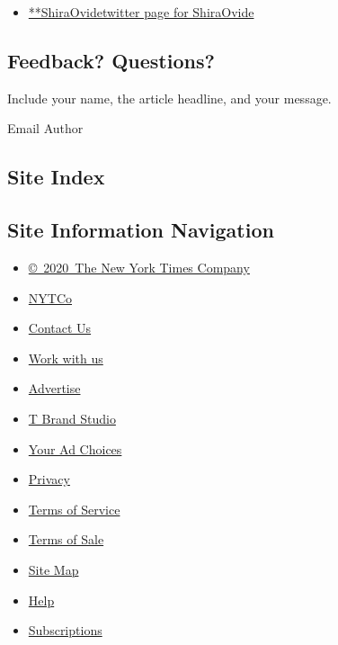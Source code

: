 \begin{itemize}
\tightlist
\item
  \href{https://twitter.com/ShiraOvide}{**ShiraOvidetwitter page for
  ShiraOvide}
\end{itemize}

\hypertarget{feedback-questions}{%
\subsection{Feedback? Questions?}\label{feedback-questions}}

Include your name, the article headline, and your message.

Email Author

\hypertarget{site-index}{%
\subsection{Site Index}\label{site-index}}

\hypertarget{site-information-navigation}{%
\subsection{Site Information
Navigation}\label{site-information-navigation}}

\begin{itemize}
\tightlist
\item
  \href{https://help.nytimes.com/hc/en-us/articles/115014792127-Copyright-notice}{©~2020~The
  New York Times Company}
\end{itemize}

\begin{itemize}
\tightlist
\item
  \href{https://www.nytco.com/}{NYTCo}
\item
  \href{https://help.nytimes.com/hc/en-us/articles/115015385887-Contact-Us}{Contact
  Us}
\item
  \href{https://www.nytco.com/careers/}{Work with us}
\item
  \href{https://nytmediakit.com/}{Advertise}
\item
  \href{http://www.tbrandstudio.com/}{T Brand Studio}
\item
  \href{https://www.nytimes.com/privacy/cookie-policy\#how-do-i-manage-trackers}{Your
  Ad Choices}
\item
  \href{https://www.nytimes.com/privacy}{Privacy}
\item
  \href{https://help.nytimes.com/hc/en-us/articles/115014893428-Terms-of-service}{Terms
  of Service}
\item
  \href{https://help.nytimes.com/hc/en-us/articles/115014893968-Terms-of-sale}{Terms
  of Sale}
\item
  \href{https://spiderbites.nytimes.com}{Site Map}
\item
  \href{https://help.nytimes.com/hc/en-us}{Help}
\item
  \href{https://www.nytimes.com/subscription?campaignId=37WXW}{Subscriptions}
\end{itemize}
